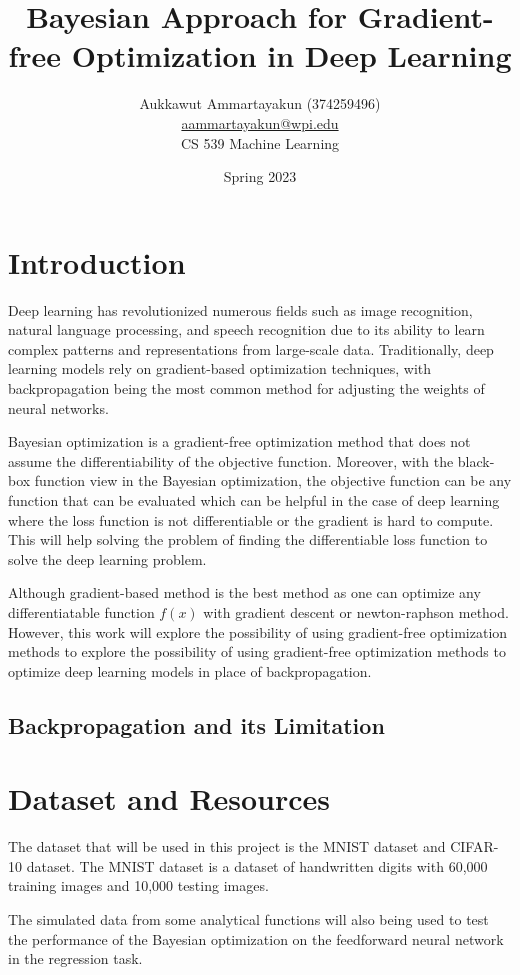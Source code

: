 \documentclass{article}
\title{Bayesian Approach for Gradient-free Optimization in Deep Learning}
\author{Aukkawut Ammartayakun (374259496)\\\href{mailto:aammartayakun@wpi.edu}{aammartayakun@wpi.edu} \\CS 539 Machine Learning}
\date{Spring 2023}
\begin{document}
\maketitle
\section{Introduction}
Deep learning has revolutionized numerous fields such as image recognition, natural language processing, 
and speech recognition due to its ability to learn complex patterns and representations from large-scale data. 
Traditionally, deep learning models rely on gradient-based optimization techniques, with backpropagation being 
the most common method for adjusting the weights of neural networks. 

Bayesian optimization is a gradient-free optimization method that does not assume the differentiability of the objective function. Moreover, with the 
black-box function view in the Bayesian optimization\cite{bo}, the objective function can be any function that can be evaluated which can be helpful in 
the case of deep learning where the loss function is not differentiable or the gradient is hard to compute. This will help solving the problem of finding 
the differentiable loss function to solve the deep learning problem.

Although gradient-based method is the best method as one can optimize any differentiatable function $f(x)$
with gradient descent or newton-raphson method. However, this work will explore the possibility of using gradient-free optimization methods to explore the possibility of 
using gradient-free optimization methods to optimize deep learning models in place of backpropagation.

\subsection{Backpropagation and its Limitation}


\section{Dataset and Resources}
The dataset that will be used in this project is the MNIST dataset\cite{mnist} and CIFAR-10\cite{cifar10} dataset. 
The MNIST dataset is a dataset of handwritten digits with 60,000 training images and 10,000 testing images.

The simulated data from some analytical functions will also being used to test the performance of the Bayesian optimization on the feedforward neural network in the regression task.
\end{document}
